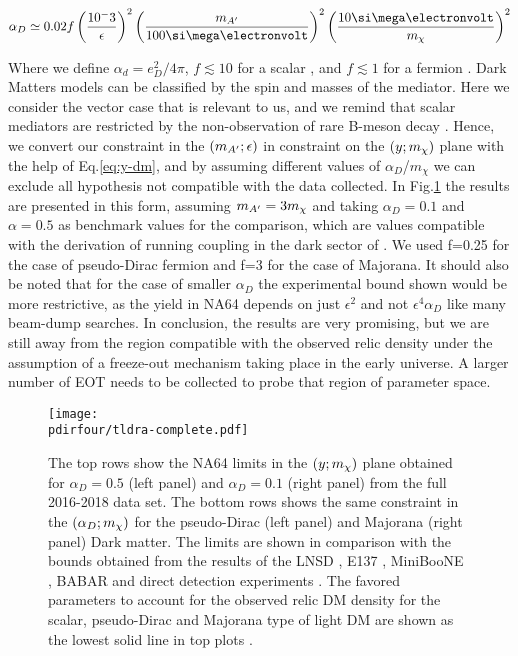 \begin{equation}
  \label{eq:ad-freeze-out}
  \alpha_D \simeq 0.02 f\left(\frac{10^-3}{\epsilon}\right)^2\left(\frac{m_{\DM}}{100 \mev}\right)^2\left(\frac{10 \mev}{m_{\chi}}\right)^2
\end{equation}

Where we define $\alpha_d = e^2_D/4\pi$, $f\lesssim 10$ for a scalar \cite{deNiverville:2011it}, and $f\lesssim 1$ for a fermion \cite{PhysRevD.91.094026}. Dark Matters models can be classified by the spin and masses of the mediator. Here we consider the vector case that is relevant to us, and we remind that scalar mediators are restricted by the non-observation of rare B-meson decay \cite{battaglieri2017cosmic}. Hence, we convert our constraint in the $(m_{A'};\epsilon)$ in constraint on the $(y;m_{\chi})$ plane with the help of Eq.\ref{eq:y-dm}, and by assuming different values of $\alpha_D$/$m_{\chi}$ we can exclude all hypothesis not compatible with the data collected. In Fig.\ref{fig:dm-alpha-excl} the results are presented in this form, assuming $m_{A'} = 3m_{\chi}$ and taking $\alpha_D=0.1$ and $\alpha=0.5$ as benchmark values for the comparison, which are values compatible with the derivation of running coupling in the dark sector of \cite{Davoudiasl:2015hxa}. We used f=0.25 for the case of pseudo-Dirac fermion and f=3 for the case of Majorana. It should also be noted that for the case of smaller $\alpha_D$ the experimental bound shown would be more restrictive, as the yield in NA64 depends on just $\epsilon^2$ and not $\epsilon^4 \alpha_D$ like many beam-dump searches. In conclusion, the results are very promising, but we are still away from the region compatible with the observed relic density under the assumption of a freeze-out mechanism taking place in the early universe. A larger number of EOT needs to be collected to probe that region of parameter space.

\begin{figure}[bth!]
  \centering
  \texttt{[image: \\pdirfour/tldra-complete.pdf]}
  \caption[Exclusion limit in the $dmyplane$ for scalr, pseudo-Dirac and Majorana type of light Dark Matter]{The top rows show the NA64 limits in the $(y;m_{\chi})$ plane obtained for $\alpha_D = 0.5$ (left panel) and $\alpha_D = 0.1$ (right panel) from the full 2016-2018 data set. The bottom rows shows the same constraint in the $(\alpha_D;m_{\chi})$ for the pseudo-Dirac (left panel) and Majorana (right panel) Dark matter. The limits are shown in comparison with the bounds obtained from the results of the LNSD \cite{deNiverville:2011it}, E137 \cite{e137}, MiniBooNE \cite{Aguilar-Arevalo:2018wea}, BABAR \cite{babar1} and direct detection experiments \cite{Essig:2012yx}. The favored parameters to account for the observed relic DM density for the scalar, pseudo-Dirac and Majorana type of light DM are shown as the lowest solid line in top plots \cite{Berlin:2018bsc}.}
  \label{fig:dm-alpha-excl}
\end{figure}
